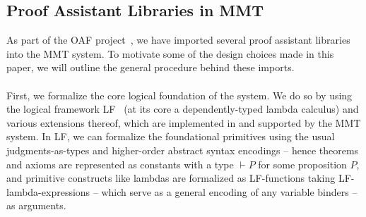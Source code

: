 %
%

\subsection{Proof Assistant Libraries in MMT}\label{sec:oaf}

As part of the OAF project~\cite{OAFproject:on}, we have imported several proof assistant libraries into the MMT system. To motivate some of the design choices made in this paper, we will outline the general procedure behind these imports.

\paragraph{} First, we formalize the core logical foundation of the system. We do so by using the logical framework LF~\cite{lf} (at its core a dependently-typed lambda calculus) and various extensions thereof, which are implemented in and supported by the MMT system. In LF, we can formalize the foundational primitives using the usual judgments-as-types and higher-order abstract syntax encodings -- hence theorems and axioms are represented as constants with a type $\vdash P$ for some proposition $P$, and primitive constructs like lambdas are formalized as LF-functions taking LF-lambda-expressions -- which serve as a general encoding of any variable binders -- as arguments.


